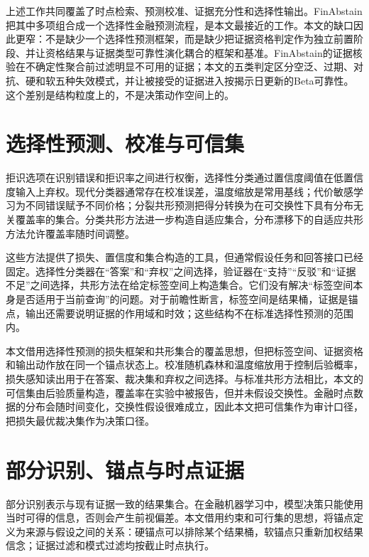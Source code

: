 上述工作共同覆盖了时点检索、预测校准、证据充分性和选择性输出。FinAbstain把其中多项组合成一个选择性金融预测流程，是本文最接近的工作\citep{torres2026finabstain}。本文的缺口因此更窄：不是缺少一个选择性预测框架，而是缺少把证据资格判定作为独立前置阶段、并让资格结果与证据类型可靠性演化耦合的框架和基准。FinAbstain的证据核验在不确定性聚合前过滤明显不可用的证据；本文的五类判定区分空泛、过期、对抗、硬和软五种失效模式，并让被接受的证据进入按揭示日更新的Beta可靠性。这个差别是结构粒度上的，不是决策动作空间上的。

\section{选择性预测、校准与可信集}

拒识选项在识别错误和拒识率之间进行权衡\citep{chow1970optimum}，选择性分类通过置信度阈值在低置信度输入上弃权\citep{geifman2017selective}。现代分类器通常存在校准误差，温度缩放是常用基线\citep{guo2017calibration}；代价敏感学习为不同错误赋予不同价格\citep{elkan2001cost}；分裂共形预测把得分转换为在可交换性下具有分布无关覆盖率的集合\citep{vovk2005algorithmic,angelopoulos2021gentle}。分类共形方法进一步构造自适应集合\citep{romano2020classification}，分布漂移下的自适应共形方法允许覆盖率随时间调整\citep{gibbs2021adaptive}。

这些方法提供了损失、置信度和集合构造的工具，但通常假设任务和回答接口已经固定。选择性分类器在“答案”和“弃权”之间选择，验证器在“支持”“反驳”和“证据不足”之间选择，共形方法在给定标签空间上构造集合。它们没有解决“标签空间本身是否适用于当前查询”的问题。对于前瞻性断言，标签空间是结果桶，证据是锚点，输出还需要说明证据的作用域和时效；这些结构不在标准选择性预测的范围内。

本文借用选择性预测的损失框架和共形集合的覆盖思想，但把标签空间、证据资格和输出动作放在同一个锚点状态上。校准随机森林和温度缩放用于控制后验概率，损失感知读出用于在答案、裁决集和弃权之间选择。与标准共形方法相比，本文的可信集由后验质量构造，覆盖率在实验中被报告，但并未假设交换性。金融时点数据的分布会随时间变化，交换性假设很难成立，因此本文把可信集作为审计口径，把损失最优裁决集作为决策口径。

\section{部分识别、锚点与时点证据}

部分识别表示与现有证据一致的结果集合\citep{manski2003partial}。在金融机器学习中，模型决策只能使用当时可得的信息，否则会产生前视偏差\citep{lopezdeprado2018advances}。本文借用约束和可行集的思想，将锚点定义为来源与假设之间的关系：硬锚点可以排除某个结果桶，软锚点只重新加权结果信念；证据过滤和模式过滤均按截止时点执行。

